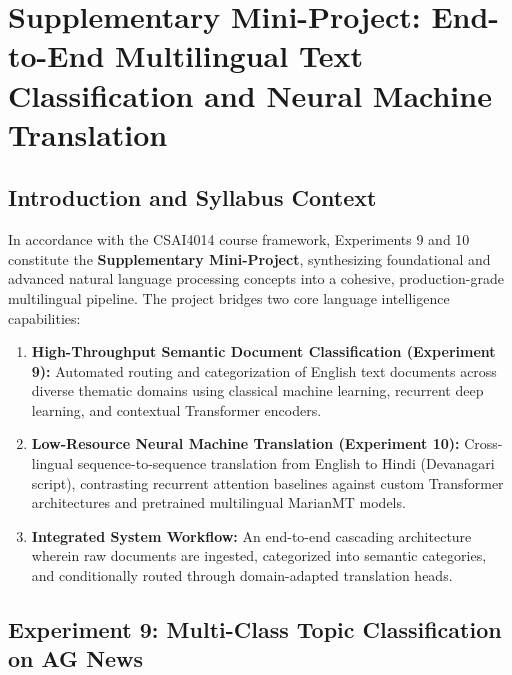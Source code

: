 \chapter{Supplementary Mini-Project: End-to-End Multilingual Text Classification and Neural Machine Translation}

\section{Introduction and Syllabus Context}
In accordance with the CSAI4014 course framework, Experiments 9 and 10 constitute the \textbf{Supplementary Mini-Project}, synthesizing foundational and advanced natural language processing concepts into a cohesive, production-grade multilingual pipeline. The project bridges two core language intelligence capabilities:
\begin{enumerate}
    \item \textbf{High-Throughput Semantic Document Classification (Experiment 9):} Automated routing and categorization of English text documents across diverse thematic domains using classical machine learning, recurrent deep learning, and contextual Transformer encoders.
    \item \textbf{Low-Resource Neural Machine Translation (Experiment 10):} Cross-lingual sequence-to-sequence translation from English to Hindi (Devanagari script), contrasting recurrent attention baselines against custom Transformer architectures and pretrained multilingual MarianMT models.
    \item \textbf{Integrated System Workflow:} An end-to-end cascading architecture wherein raw documents are ingested, categorized into semantic categories, and conditionally routed through domain-adapted translation heads.
\end{enumerate}

\section{Experiment 9: Multi-Class Topic Classification on AG News}

